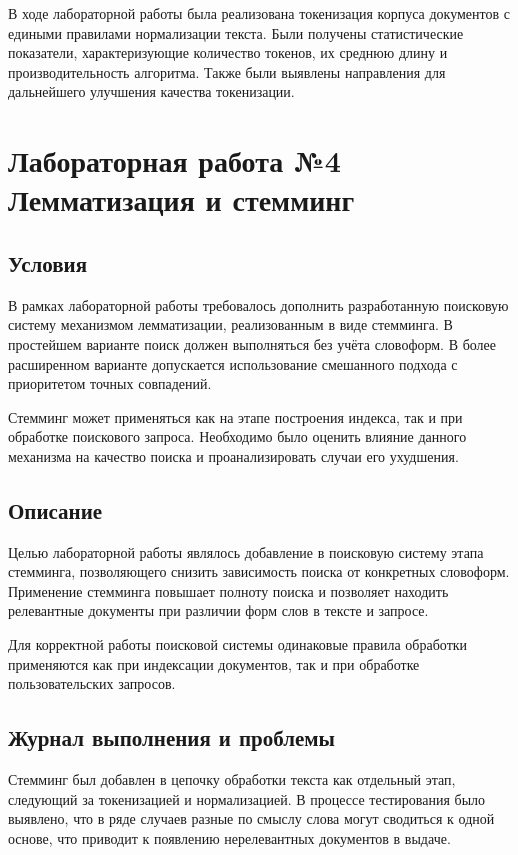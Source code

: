 \documentclass[12pt,a4paper]{article}
\begin{document}
В ходе лабораторной работы была реализована токенизация корпуса документов с едиными правилами нормализации текста. Были получены статистические показатели, характеризующие количество токенов, их среднюю длину и производительность алгоритма. Также были выявлены направления для дальнейшего улучшения качества токенизации.

\newpage
\section*{Лабораторная работа №4\\
Лемматизация и стемминг}

\subsection*{Условия}

В рамках лабораторной работы требовалось дополнить разработанную поисковую систему механизмом лемматизации, реализованным в виде стемминга. В простейшем варианте поиск должен выполняться без учёта словоформ. В более расширенном варианте допускается использование смешанного подхода с приоритетом точных совпадений.

Стемминг может применяться как на этапе построения индекса, так и при обработке поискового запроса. Необходимо было оценить влияние данного механизма на качество поиска и проанализировать случаи его ухудшения.

\subsection*{Описание}

Целью лабораторной работы являлось добавление в поисковую систему этапа стемминга, позволяющего снизить зависимость поиска от конкретных словоформ. Применение стемминга повышает полноту поиска и позволяет находить релевантные документы при различии форм слов в тексте и запросе.

Для корректной работы поисковой системы одинаковые правила обработки применяются как при индексации документов, так и при обработке пользовательских запросов.

\subsection*{Журнал выполнения и проблемы}

Стемминг был добавлен в цепочку обработки текста как отдельный этап, следующий за токенизацией и нормализацией. В процессе тестирования было выявлено, что в ряде случаев разные по смыслу слова могут сводиться к одной основе, что приводит к появлению нерелевантных документов в выдаче.
\end{document}
